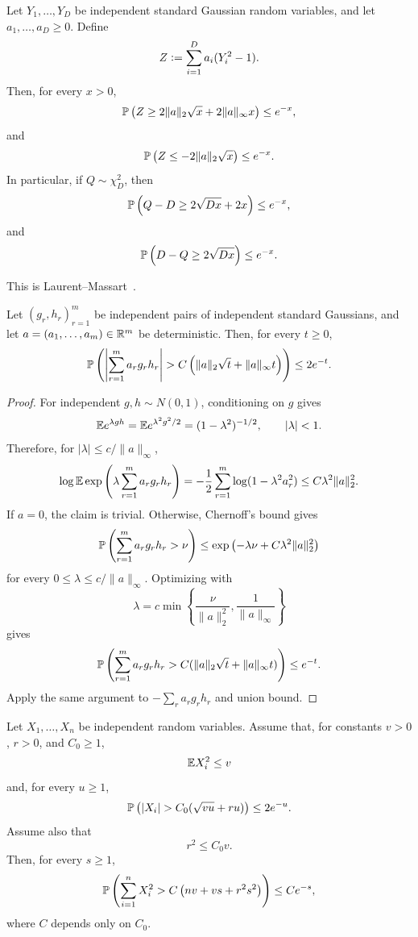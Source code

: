 \begin{theorem}
\label{thm:laurent-massart}
Let \(Y_1,\dots,Y_D\) be independent standard Gaussian random variables, and let
\(a_1,\dots,a_D\ge0\). Define
\[
Z\vcentcolon= \sum_{i=1}^D a_i(Y_i^2-1).
\]
Then, for every \(x>0\),
\[
\mathbb{P}\left(
Z\ge 2\|a\|_2\sqrt x+2\|a\|_\infty x
\right)
\le e^{-x},
\]
and
\[
\mathbb{P}\left(
Z\le -2\|a\|_2\sqrt x
\right)
\le e^{-x}.
\]
In particular, if \(Q\sim\chi^2_D\), then
\[
\mathbb{P}\left(Q-D\ge 2\sqrt{Dx}+2x\right)
\le e^{-x},
\]
and
\[
\mathbb{P}\left(D-Q\ge 2\sqrt{Dx}\right)
\le e^{-x}.
\]
\end{theorem}

\noindent
This is Laurent--Massart~\cite[Lemma~1]{laurent2000adaptive}.




\begin{lemma}
\label{lem:weighted-product-gaussian}
Let \((g_r,h_r)_{r=1}^m\) be independent pairs of independent standard
Gaussians, and let \(a=(a_1,\dots,a_m)\in\mathbb{R}^m\) be deterministic. Then, for every
\(t\ge0\),
\[
\mathbb{P}\left(
\left|
\sum_{r=1}^m a_rg_rh_r
\right|
>
C\left(\|a\|_2\sqrt t+\|a\|_\infty t\right)
\right)
\le 2e^{-t}.
\]
\end{lemma}

\begin{proof}
For independent \(g,h\sim N(0,1)\), conditioning on \(g\) gives
\[
\mathbb{E} e^{\lambda gh}
=
\mathbb{E} e^{\lambda^2g^2/2}
=
(1-\lambda^2)^{-1/2},
\qquad |\lambda|<1.
\]
Therefore, for \(|\lambda|\le c/\|a\|_\infty\),
\[
\log\mathbb{E}\exp\left(\lambda\sum_{r=1}^m a_rg_rh_r\right)
=
-\frac12\sum_{r=1}^m\log(1-\lambda^2a_r^2)
\le
C\lambda^2\|a\|_2^2.
\]
If \(a=0\), the claim is trivial. Otherwise, Chernoff's bound gives
\[
\mathbb{P}\left(
\sum_{r=1}^m a_rg_rh_r
>
\nu
\right)
\le
\exp\left(-\lambda\nu+C\lambda^2\|a\|_2^2\right)
\]
for every \(0\le\lambda\le c/\|a\|_\infty\). Optimizing with
\[
\lambda
=
 c\min\left\{\frac{\nu}{\|a\|_2^2},\frac1{\|a\|_\infty}\right\}
\]
gives
\[
\mathbb{P}\left(
\sum_{r=1}^m a_rg_rh_r
>
C(\|a\|_2\sqrt t+\|a\|_\infty t)
\right)
\le e^{-t}.
\]
Apply the same argument to \(-\sum_r a_rg_rh_r\) and union bound.
\end{proof}

\begin{lemma}
\label{lem:square-sum-two-level}
Let \(X_1,\dots,X_n\) be independent random variables. Assume that, for constants
\(v>0\), \(r>0\), and \(C_0\ge1\),
\[
\mathbb{E} X_i^2\le v
\]
and, for every \(u\ge1\),
\[
\Pbb\left(
|X_i|>C_0(\sqrt{vu}+ru)
\right)
\le 2e^{-u}.
\]
Assume also that
\[
r^2\le C_0v.
\]
Then, for every \(s\ge1\),
\[
\mathbb{P}\left(
\sum_{i=1}^nX_i^2
>
C\left(nv+vs+r^2s^2\right)
\right)
\le Ce^{-s},
\]
where \(C\) depends only on \(C_0\).
\end{lemma}

